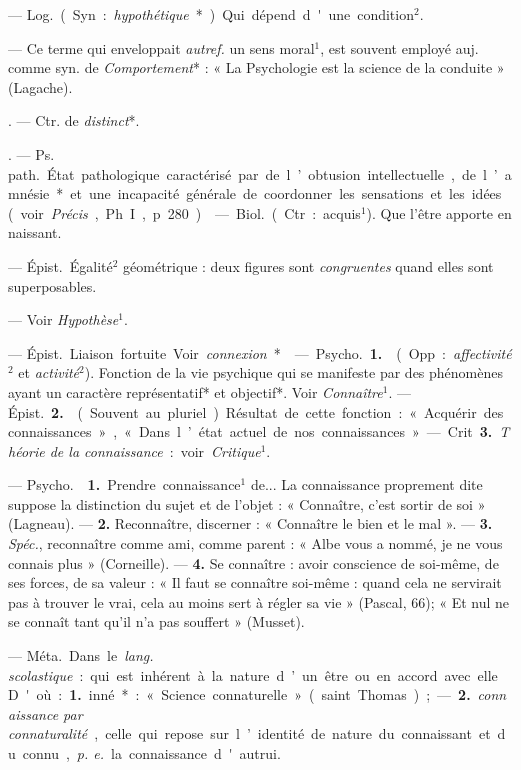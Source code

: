 \begin{itemize}[leftmargin=1cm, label=, itemsep=11pt]
 — \si{Log.} (Syn. : {\it hypothétique}*). Qui dépend d'une condition$^2$.

 — Ce terme qui enveloppait
{\it autref.} un sens moral$^1$, est souvent
employé auj. comme syn. de {\it Comportement}* : « La Psychologie est la
science de la conduite » (Lagache).

. — Ctr. de {\it distinct}*.

. — \si{Ps. path.} État
pathologique caractérisé par de
l’obtusion intellectuelle, de l’amnésie* et une incapacité générale de
coordonner les sensations et les
idées (voir  {\it Précis}, Ph. I, p. 280).

 — \si{Biol.} (Ctr. : acquis$^1$).
Que l’être apporte en naissant.

 — \si{Épist.} Égalité$^2$ géométrique : deux figures sont {\it congruentes} quand elles sont superposables.

 — Voir {\it Hypothèse}$^1$.

 — \si{Épist.} Liaison fortuite. Voir {\it connexion}*.

 — \si{Psycho.} {\bf 1.}  (Opp. :
{\it affectivité}$^2$ et {\it activité}$^2$). Fonction de
la vie psychique qui se manifeste
par des phénomènes ayant un caractère représentatif* et objectif*. Voir
{\it Connaître}$^1$. — \si{Épist.} {\bf 2.}  (Souvent
au pluriel). Résultat de cette fonction : « Acquérir des connaissances »,
« Dans l’état actuel de nos connaissances ».

— Crit. {\bf 3.} {\it Théorie de la connaissance} : voir {\it Critique}$^1$.

 — \si{Psycho.}  {\bf 1.} Prendre
connaissance$^1$ de... La connaissance
proprement dite suppose la distinction du sujet et de l’objet : « Connaître, c’est sortir de soi » (Lagneau).
— {\bf 2.} Reconnaître, discerner :
« Connaître le bien et le mal ». —
 {\bf 3.} {\it Spéc.}, reconnaître comme ami,
comme parent : « Albe vous a nommé,
je ne vous connais plus » (Corneille).
—  {\bf 4.} Se connaître : avoir conscience de soi-même, de ses forces,
de sa valeur : « Il faut se connaître
soi-même : quand cela ne servirait
pas à trouver le vrai, cela au moins
sert à régler sa vie » (Pascal, 66); « Et
nul ne se connaît tant qu'il n’a pas
souffert » (Musset).

 — \si{Méta.} Dans le {\it lang.
scolastique} : qui est inhérent à la
nature d’un être ou en accord avec
elle. D'où : {\bf 1.} inné* : « Science connaturelle » (saint Thomas) ; — {\bf 2.} {\it connaissance par connaturalité}, celle
qui repose sur l’identité de nature
du connaissant et du connu, {\it p. e.} la
connaissance d'autrui.


\end{itemize}
